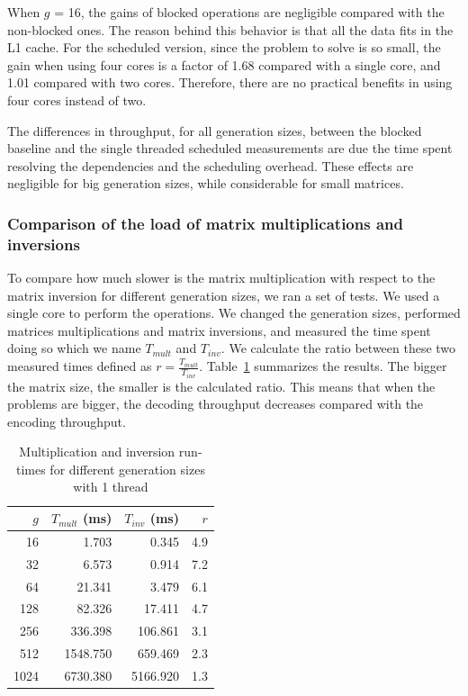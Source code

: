 When $g$ = 16, the gains of blocked operations are negligible compared with
the non-blocked ones. The reason behind this behavior is that all the data
fits in the L1 cache. For the scheduled version, since the problem to solve
is so small, the gain when using four cores is a factor of 1.68 compared
with a single core, and 1.01 compared with two cores. Therefore, there
are no practical benefits in using four cores instead of two.

The differences in throughput, for all generation sizes, between the
blocked baseline and the single threaded scheduled measurements are due the
time spent resolving the dependencies and the scheduling overhead. These
effects are negligible for big generation sizes, while considerable for
small matrices.

\subsubsection{Comparison of the load of matrix multiplications and inversions}

To compare how much slower is the matrix multiplication with respect to the
matrix inversion for different generation sizes, we ran a set of tests. We used
a single core to perform the operations. We changed the generation sizes,
performed matrices multiplications and matrix inversions, and measured the time
spent doing so which we name $T_{mult}$ and $T_{inv}$. We calculate the ratio
between these two measured times defined as $r = \frac{T_{mult}}{T_{inv}}$.
Table~\ref{runtimes} summarizes the results. The bigger the matrix size, the
smaller is the calculated ratio. This means that when the problems are bigger,
the decoding throughput decreases compared with the encoding throughput.

\begin{table}[H]
\center
\caption{Multiplication and inversion run-times for different generation sizes with 1 thread}
\begin{tabular}{|r|r|r|r|}

\hline
$g$ & $T_{mult}$ (ms) & $T_{inv}$ (ms) &$r$ \\
\hline
\hline

	16   & 1.703     & 0.345    & 4.9 \\
\hline
	32   & 6.573     & 0.914    & 7.2 \\
\hline
	64   & 21.341    & 3.479    & 6.1 \\
\hline
	128  & 82.326    & 17.411   & 4.7 \\
\hline
	256  & 336.398   & 106.861  & 3.1 \\
\hline
	512  & 1548.750  & 659.469  & 2.3 \\
\hline
	1024 & 6730.380  & 5166.920 & 1.3 \\
\hline
\end{tabular}
\vspace{0.2cm}
\label{runtimes}
\end{table}
